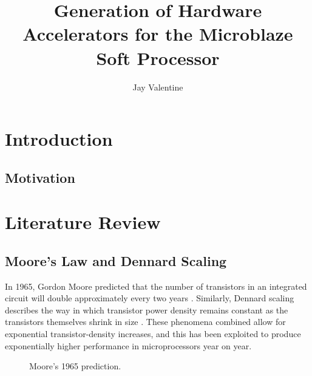 \documentclass{UoYCSproject}
\begin{document}
\title{Generation of Hardware Accelerators for the Microblaze Soft Processor}
\author{Jay Valentine}

\maketitle

\begin{abstract}
\end{abstract}

\chapter{Introduction}

\section{Motivation}

\chapter{Literature Review}

\section{Moore's Law and Dennard Scaling}

In 1965, Gordon Moore predicted that the number of transistors in an integrated circuit will double
approximately every two years  \cite{moore}. Similarly, Dennard scaling describes the way in which transistor power density
remains constant as the transistors themselves shrink in size \cite{dennard}. These phenomena combined allow for exponential
transistor-density increases, and this has been exploited to produce exponentially higher performance in
microprocessors year on year.

\begin{figure}[h]
\caption{Moore's 1965 prediction. \cite{moore}}
\end{figure}
\end{document}
